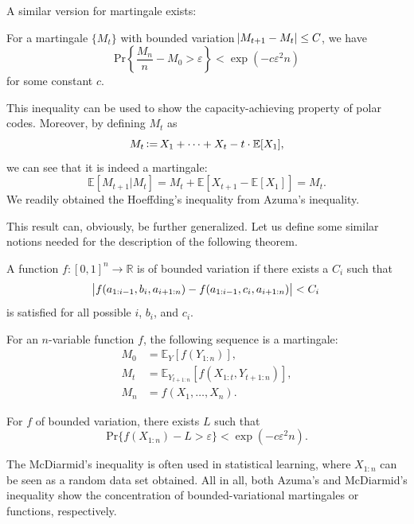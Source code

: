 A similar version for martingale exists:
\begin{theorem}
    For a martingale $\{M_t\}$ with bounded variation $\abs{M_{t+1}-M_t}\le C$, we have
    \begin{equation}
        \mathrm{Pr}\left\{\frac{M_n}{n}-M_0 > \varepsilon\right\} < \exp(-c\varepsilon^2n)
    \end{equation}
    for some constant $c$.
\end{theorem}
This inequality can be used to show the capacity-achieving property of polar codes. Moreover, by defining $M_t$ as
\begin{equation}
    M_t \operatorname{\vcentcolon=} X_1+\cdots+X_t - t\cdot\mathbb{E}[X_1],
\end{equation}
we can see that it is indeed a martingale:
\begin{equation*}
    \mathbb{E}[M_{t+1}\vert M_t] = M_t + \mathbb{E}\left[X_{t+1}-\mathbb{E}[X_1]\right] = M_t.
\end{equation*}
We readily obtained the Hoeffding's inequality from Azuma's inequality.

This result can, obviously, be further generalized. Let us define some similar notions needed for the description of the following theorem.
\begin{definition}
    A function $f:[0,1]^n\rightarrow \mathbb{R}$ is of bounded variation if there exists a $C_i$ such that
    \begin{equation}
        \abs{f(a_{1:i-1},b_i,a_{i+1:n}) - f(a_{1:i-1},c_i,a_{i+1:n})} < C_i
    \end{equation}
    is satisfied for all possible $i$, $b_i$, and $c_i$.
\end{definition}
\begin{definition}
    For an $n$-variable function $f$, the following sequence is a martingale:
    \begin{align}
        M_0 &= \mathbb{E}_Y[f(Y_{1:n})], \\
        M_t &= \mathbb{E}_{Y_{t+1:n}}[f(X_{1:t},Y_{t+1:n})], \\
        M_n &= f(X_1,\ldots,X_n).
    \end{align}
\end{definition}
\begin{theorem}
    For $f$ of bounded variation, there exists $L$ such that
    \begin{equation}
        \mathrm{Pr}\{f(X_{1:n}) - L > \varepsilon\} < \exp(-c\varepsilon^2n).
    \end{equation}
\end{theorem}
The McDiarmid's inequality is often used in statistical learning, where $X_{1:n}$ can be seen as a random data set obtained. All in all, both Azuma's and McDiarmid's inequality show the concentration of bounded-variational martingales or functions, respectively.

